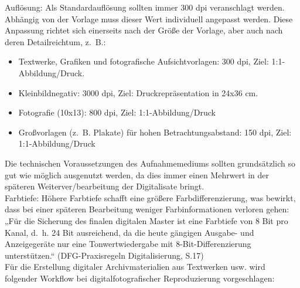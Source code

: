 \documentclass{article}
\begin{document}
        Auflösung: Als Standardauflösung sollten immer 300 dpi veranschlagt werden. Abhängig von der Vorlage muss dieser Wert individuell angepasst werden. Diese Anpassung richtet sich einerseits nach der Größe der Vorlage, aber auch nach deren Detailreichtum, z. B.:\\
            
        \begin{itemize}\item {Textwerke, Grafiken und fotografische Aufsichtvorlagen: 300 dpi, Ziel: 1:1-Abbildung/Druck.}\item {Kleinbildnegativ: 3000 dpi, Ziel: Druckrepräsentation in 24x36 cm.}\item {Fotografie (10x13): 800 dpi, Ziel: 1:1-Abbildung/Druck}\item {Großvorlagen (z. B. Plakate) für hohen Betrachtungsabstand: 150 dpi, Ziel: 1:1-Abbildung/Druck}\end{itemize}Die technischen Voraussetzungen des Aufnahmemediums sollten grundsätzlich so gut wie möglich ausgenutzt werden, da dies immer einen Mehrwert in der späteren Weiterver/bearbeitung der Digitalisate bringt.\\
            
        Farbtiefe: Höhere Farbtiefe schafft eine größere Farbdifferenzierung, was bewirkt, dass bei einer späteren Bearbeitung weniger Farbinformationen verloren gehen: „Für die Sicherung des finalen digitalen Master ist eine Farbtiefe von 8 Bit pro Kanal, d. h. 24 Bit ausreichend, da die heute gängigen Ausgabe- und Anzeigegeräte nur eine Tonwertwiedergabe mit 8-Bit-Differenzierung unterstützen.“ (DFG-Praxisregeln Digitalisierung, S.17)\\
            
        Für die Erstellung digitaler Archivmaterialien aus Textwerken usw. wird folgender Workflow bei digitalfotografischer Reproduzierung vorgeschlagen: \\
            
\end{document}
